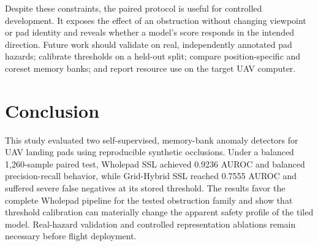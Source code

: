 \documentclass[sigconf,nonacm]{acmart}
\begin{document}
Despite these constraints, the paired protocol is useful for controlled development. It exposes the effect of an obstruction without changing viewpoint or pad identity and reveals whether a model's score responds in the intended direction. Future work should validate on real, independently annotated pad hazards; calibrate thresholds on a held-out split; compare position-specific and coreset memory banks; and report resource use on the target UAV computer.

\section{Conclusion}
This study evaluated two self-supervised, memory-bank anomaly detectors for UAV landing pads using reproducible synthetic occlusions. Under a balanced 1,260-sample paired test, Wholepad SSL achieved 0.9236 AUROC and balanced precision-recall behavior, while Grid-Hybrid SSL reached 0.7555 AUROC and suffered severe false negatives at its stored threshold. The results favor the complete Wholepad pipeline for the tested obstruction family and show that threshold calibration can materially change the apparent safety profile of the tiled model. Real-hazard validation and controlled representation ablations remain necessary before flight deployment.
\end{document}
